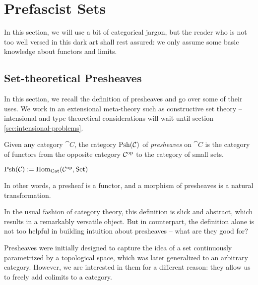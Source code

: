 \setchapterpreamble[u]{\margintoc}
\chapter{Prefascist Sets}


In this section, we will use a bit of categorical jargon, but the reader
who is not too well versed in this dark art shall rest assured:
we only assume some basic knowledge about functors and limits.

\section{Set-theoretical Presheaves}\label{sec:categorical-reminders}

In this section, we recall the definition of presheaves and go over 
some of their uses. 
% 
We work in an extensional meta-theory such as constructive set theory --
intensional and type theoretical considerations will wait until section 
\ref{sec:intensional-problems}.

Given any category \( \cat{C} \), the category 
\( \catPsh{\cat{C}} \) of \emph{presheaves} on \( \cat{C} \) is the category 
of functors from the opposite category \( \op{\cat{C}} \) to the category of 
small sets.
\begin{definition}
\(
    \catPsh{\cat{C}} := \hom[\catCat]{\op{\cat{C}}}{\catSet}
\)
\end{definition}
In other words, a presheaf is a functor, and a morphism of presheaves
is a natural transformation.

In the usual fashion of category theory, this definition is slick
and abstract, which results in a remarkably versatile object. 
% 
But in counterpart, the definition alone is not too helpful in building
intuition about presheaves -- what are they good for?

Presheaves were initially designed to capture 
the idea of a set continuously parametrized by a topological space, which
was later generalized to an arbitrary category. 
% 
However, we are interested in them for a different reason: they allow us
to freely add colimits to a category.

